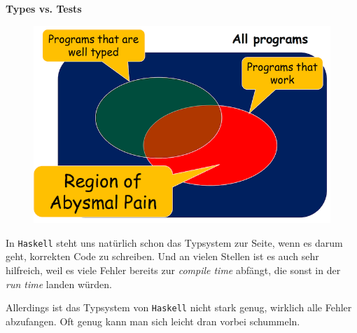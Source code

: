 \documentclass{beamer}
\begin{document}

\begin{frame}
\textbf{Types vs. Tests}\bigskip

\begin{figure}
  \vspace{-20pt}
  \begin{center}
    \includegraphics[scale=0.4]{region-of-abysmal-pain.png} 
  \end{center}
  \vspace{-20pt}
\end{figure}

In \texttt{Haskell} steht uns natürlich schon das Typsystem zur Seite, wenn es darum geht, korrekten Code zu schreiben. Und an vielen Stellen ist es auch sehr hilfreich, weil es viele Fehler bereits zur \emph{compile time} abfängt, die sonst in der \emph{run time} landen würden.
\bigskip

Allerdings ist das Typsystem von \texttt{Haskell} nicht stark genug, wirklich alle Fehler abzufangen. Oft genug kann man sich leicht dran vorbei schummeln.
\end{frame}

\end{document}
